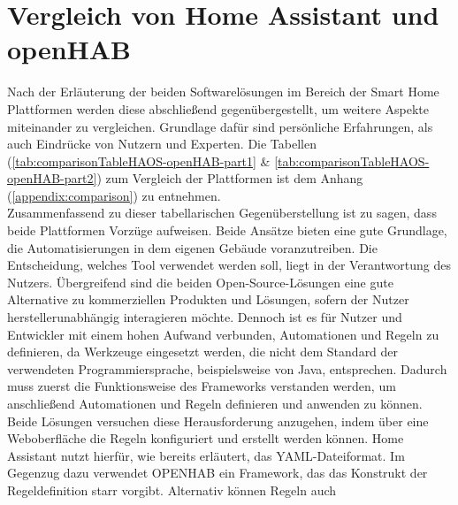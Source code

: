 \section{Vergleich von Home Assistant und openHAB}
\label{sec:comparison-HAOS-openHAB}
    Nach der Erläuterung der beiden Softwarelösungen im Bereich der Smart Home Plattformen werden diese abschließend 
    gegenübergestellt, um weitere Aspekte miteinander zu vergleichen. Grundlage dafür sind persönliche Erfahrungen, als auch 
    Eindrücke von Nutzern und Experten. Die Tabellen (\ref{tab:comparisonTableHAOS-openHAB-part1} \& \ref{tab:comparisonTableHAOS-openHAB-part2}) zum Vergleich 
    der Plattformen ist dem Anhang (\ref{appendix:comparison}) zu entnehmen.
    \\
    \linebreak
    Zusammenfassend zu dieser tabellarischen Gegenüberstellung ist zu sagen, dass beide Plattformen Vorzüge aufweisen.  
    Beide Ansätze bieten eine gute Grundlage, die Automatisierungen in dem eigenen Gebäude voranzutreiben. Die Entscheidung, welches 
    Tool verwendet werden soll, liegt in der Verantwortung des Nutzers. Übergreifend sind die beiden Open-Source-Lösungen eine gute 
    Alternative zu kommerziellen Produkten und Lösungen, sofern der Nutzer herstellerunabhängig interagieren möchte. Dennoch ist 
    es für Nutzer und Entwickler mit einem hohen Aufwand verbunden, Automationen und Regeln zu definieren, da Werkzeuge eingesetzt werden, 
    die nicht dem Standard der verwendeten Programmiersprache, beispielsweise von Java, 
    entsprechen. Dadurch muss zuerst die Funktionsweise des Frameworks verstanden werden, um anschließend Automationen und 
    Regeln definieren und anwenden zu können. Beide Lösungen versuchen diese Herausforderung anzugehen, indem über eine Weboberfläche 
    die Regeln konfiguriert und erstellt werden können. Home Assistant nutzt hierfür, wie bereits erläutert, das YAML-Dateiformat. Im 
    Gegenzug dazu verwendet \acs{OPENHAB} ein Framework, das das Konstrukt der Regeldefinition starr vorgibt. Alternativ können Regeln auch 

